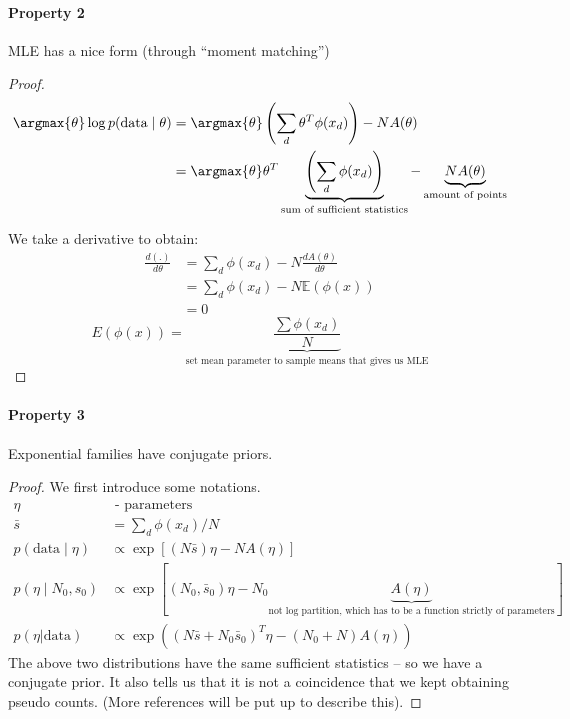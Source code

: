 \documentclass{article}
\begin{document}
\paragraph{Property 2} MLE has a nice form (through ``moment matching'')
\begin{proof}
\begin{align*} \argmax{\theta} \log p(\text{data} \mid \theta) &= \argmax{\theta} \left(\sum_d \theta^T\phi(x_d)\right) - NA(\theta) \\
&= \argmax{\theta}\theta^T\underbrace{\left(\sum_d\phi(x_d)\right)}_{\text{sum of sufficient statistics}} - \underbrace{NA(\theta)}_{\text{amount of points}}
\end{align*}

We take a derivative to obtain:
\begin{align*}
\frac{d(.)}{d \theta} &= \sum_d \phi(x_d) - N \frac{dA(\theta)}{d \theta} \\
&= \sum_d\phi(x_d) - N\mathbb{E}(\phi(x)) \\
 &= 0
\end{align*}
\[{E}(\phi(x)) = \underbrace{\frac{\sum\phi(x_d)}{N}}_{\text{set mean parameter to sample means that gives us MLE}}
\]
\end{proof}

\paragraph{Property 3} Exponential families have conjugate priors.

\begin{proof}
We first introduce some notations. 
\begin{align*}
\eta &\text{ - parameters}
\\
\bar{s} &= \sum_d\phi(x_d) / N
\\
p(\text{data} \mid \eta) &\propto \exp [(N \bar s) \eta - N A(\eta)]
\\
p(\eta \mid N_0, s_0) &\propto \exp[ (N_0, \bar s_0) \eta - N_0 \underbrace{A(\eta)}_{\text{not log partition, which has to be a function strictly of parameters}}]
\\
p(\eta | \text{data}) &\propto \exp((N\bar{s} + N_0\bar{s}_0)^T\eta - (N_0 + N)A(\eta))
\end{align*}
The above two distributions have the same sufficient statistics -- so we have a conjugate prior. It also tells us that it is not a coincidence that we kept obtaining pseudo counts. (More references will be put up to describe this). 

\end{proof}
\end{document}
